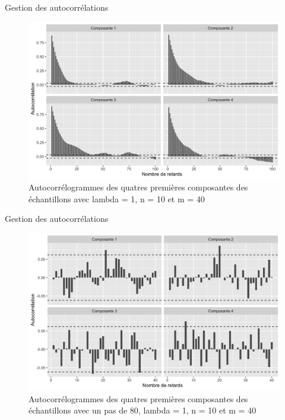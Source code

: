 \documentclass[10pt,xcolor=table,color={dvipsnames,usenames},ignorenonframetext,usepdftitle=false,french]{beamer}
\begin{document}
\begin{frame}{Gestion des autocorrélations}

\begin{figure}
\centering
\includegraphics{img/acfn10m40.png}
\caption{Autocorrélogrammes des quatres premières composantes des
échantillons avec lambda = 1, n = 10 et m = 40}
\end{figure}

\end{frame}

\begin{frame}{Gestion des autocorrélations}

\begin{figure}
\centering
\includegraphics{img/acfn10m40corr.png}
\caption{Autocorrélogrammes des quatres premières composantes des
échantillons avec un pas de 80, lambda = 1, n = 10 et m = 40}
\end{figure}

\end{frame}
\end{document}
